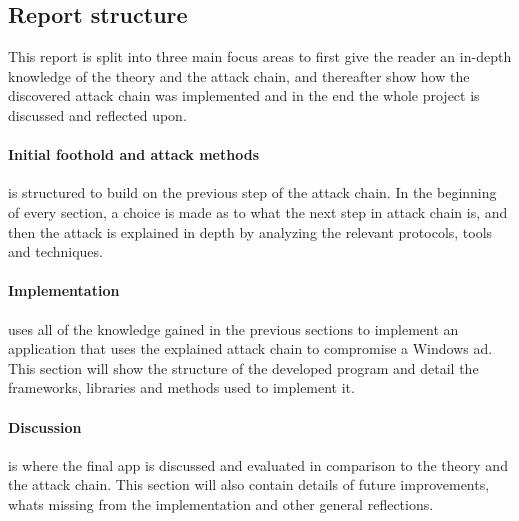 \documentclass{article}
\begin{document}
\subsection{Report structure}
This report is split into three main focus areas to first give the reader an in-depth knowledge of the theory and the attack chain, and thereafter show how the discovered attack chain was implemented and in the end the whole project is discussed and reflected upon.

\paragraph{Initial foothold and attack methods} is structured to build on the previous step of the attack chain. In the beginning of every section, a choice is made as to what the next step in attack chain is, and then the attack is explained in depth by analyzing the relevant protocols, tools and techniques.

\paragraph{Implementation} uses all of the knowledge gained in the previous sections to implement an application that uses the explained attack chain to compromise a Windows \gls{ad}. This section will show the structure of the developed program and detail the frameworks, libraries and methods used to implement it.

\paragraph{Discussion} is where the final app is discussed and evaluated in comparison to the theory and the attack chain. This section will also contain details of future improvements, whats missing from the implementation and other general reflections.
\end{document}
